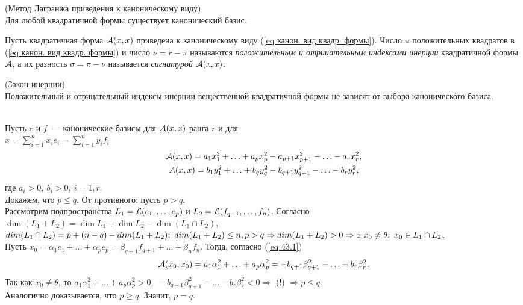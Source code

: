 \begin{theorem}
\label{th метод Лагранжа}
(Метод Лагранжа приведения к каноническому виду)\\
Для любой квадратичной формы существует канонический базис.
\end{theorem}

\begin{definition}
Пусть квадратичная форма ${\mathcal{A}}(x,x)$ приведена к каноническому виду (\ref{eq канон. вид квадр. формы}). Число $\pi$ положительных квадратов в (\ref{eq канон. вид квадр. формы}) и число $\nu=r-\pi$ называются \emph{положительным и отрицательным индексами инерции} квадратичной формы ${\mathcal{A}}$, а их разность $\sigma=\pi-\nu$ называется \emph{сигнатурой} ${\mathcal{A}}(x,x)$.
\end{definition}

\begin{theorem}
\label{th закон инерции}
(Закон инерции)\\
Положительный и отрицательный индексы инерции вещественной квадратичной формы не зависят от выбора канонического базиса.
\end{theorem}
\begin{proofocre}
~\\
Пусть $e$ и $f$~--- канонические базисы для ${\mathcal{A}}(x,x)$ ранга $r$ и для\\ $x=\sum_{i=1}^nx_ie_i=\sum_{i=1}^ny_if_i$
\begin{equation}
\label{eq 43.1}
\begin{gathered}
    {\mathcal{A}}(x,x)=a_1x_1^2+\ldots+a_px_p^2-a_{p+1}x_{p+1}^2-\ldots-a_rx_r^2,\\
    {\mathcal{A}}(x,x)=b_1y_1^2+\ldots+b_qy_q^2-b_{q+1}y_{q+1}^2-\ldots-b_ry_r^2,
\end{gathered}
\end{equation}
где $a_i>0,~b_i>0,~i=\overline{1,r}$.\\
Докажем, что $p\le q$. От противного: пусть $p>q$.\\
Рассмотрим подпространства $L_1={\mathcal{L}}(e_1,\ldots,e_p)$ и $L_2={\mathcal{L}}(f_{q+1},\ldots,f_n)$. Согласно $\dim (L_1+L_2) = \dim L_1 + \dim L_2 - \dim(L_1 \cap L_2)$, $dim(L_1\cap L_2)=p+(n-q)-dim(L_1+L_2);~dim(L_1+L_2)\le n,\\p>q \Rightarrow dim(L_1+L_2)>0 \Rightarrow\exists~x_0\neq\theta,~x_0\in L_1\cap L_2$.\\
Пусть $x_0=\alpha_1e_1+\ldots+\alpha_pe_p=\beta_{q+1}f_{q+1}+\ldots+\beta_nf_n$. Тогда, согласно (\ref{eq 43.1})
\begin{equation}
    {\mathcal{A}}(x_0,x_0)=a_1\alpha_1^2+\ldots+a_p\alpha_p^2=-b_{q+1}\beta_{q+1}^2-\ldots-b_r\beta_r^2.
\end{equation}
Так как $x_0\neq\theta$, то $a_1\alpha_1^2+\ldots+a_p\alpha_p^2>0,~-b_{q+1}\beta_{q+1}^2-\ldots-b_r\beta_r^2<0 \Rightarrow$ (!) $\Rightarrow p\le q$.\\
Аналогично доказывается, что $p\ge q$. Значит, $p=q$.
\end{proofocre}


